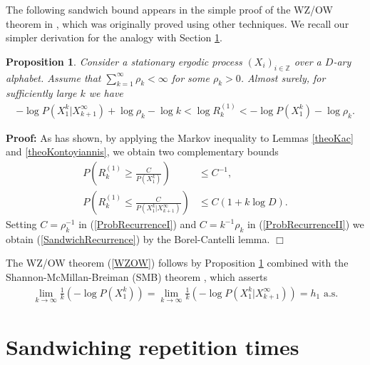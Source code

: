 \documentclass[a4paper,12pt]{article}
\newcommand{\okra}[1]{\left( #1 \right)}
\newtheorem{proposition}{Proposition}
\newenvironment*{proof}{\begin{trivlist}\item[]
\noindent\textbf{Proof:}}{$\Box$\par\end{trivlist}}
\begin{document}
The following sandwich bound appears in the simple proof of the WZ/OW
theorem in \citep[Theorem 9.12]{Debowski21}, which was originally
proved using other techniques. We recall our simpler derivation for
the analogy with Section \ref{secRepetition}.
\begin{proposition}
  \label{theoSandwichRecurrence}
  Consider a stationary ergodic process $(X_i)_{i\in\mathbb{Z}}$ over
  a $D$-ary alphabet. Assume that $\sum_{k=1}^\infty \rho_k<\infty$
  for some $\rho_k>0$.  Almost surely, for sufficiently large $k$ we have
\begin{align}
  \label{SandwichRecurrence}
  -\log P(X_1^k|X_{k+1}^\infty)
  +\log \rho_k-\log k
  <
  \log R^{(1)}_k
  <
  -\log P(X_1^k)
  -\log \rho_k
  .
\end{align}
\end{proposition}
\begin{proof}
  As \citet{Kontoyiannis98} has shown, by applying the Markov
  inequality to Lemmas \ref{theoKac} and \ref{theoKontoyiannis}, we
  obtain two complementary bounds
\begin{align}
  \label{ProbRecurrenceI}
  P\okra{R^{(1)}_k\ge \frac{C}{P(X_1^k)}}&\le C^{-1}
  ,
  \\
  \label{ProbRecurrenceII}
  P\okra{R^{(1)}_k\le \frac{C}{P(X_1^k|X_{k+1}^\infty)}}&\le C(1+k\log D)
  .
\end{align}
Setting $C=\rho_k^{-1}$ in (\ref{ProbRecurrenceI}) and $C=k^{-1}\rho_k$ in
(\ref{ProbRecurrenceII}) we obtain (\ref{SandwichRecurrence}) by the
Borel-Cantelli lemma.
\end{proof}

The WZ/OW theorem (\ref{WZOW}) follows by Proposition
\ref{theoSandwichRecurrence} combined with the
Shannon-McMillan-Breiman (SMB) theorem \citep{Shannon48, Breiman57,
  Chung61, Barron85, AlgoetCover88}, which asserts
\begin{align}
  \label{SMB}
  \lim_{k\to\infty}
  \frac{1}{k}\okra{-\log P(X_1^k)}=
  \lim_{k\to\infty}
  \frac{1}{k}\okra{-\log P(X_1^k|X_{k+1}^\infty)}=
  h_1 \text{ a.s.}
\end{align}

\section{Sandwiching repetition times}
\label{secRepetition}
\end{document}
